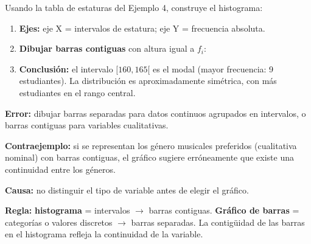 \documentclass[11pt, letterpaper]{article}
\begin{document}
\begin{tcolorbox}[examplebox, title={Ej. 5. Histograma de estaturas}]
Usando la tabla de estaturas del Ejemplo 4, construye el histograma:

\begin{enumerate}[label=\textbf{Paso \arabic*.}]
  \item \textbf{Ejes:} eje X = intervalos de estatura; eje Y = frecuencia absoluta.
  \medskip
  \item \textbf{Dibujar barras contiguas} con altura igual a $f_i$:

  \begin{center}
  \end{center}

  \medskip
  \item \textbf{Conclusi\'on:} el intervalo $[160,165[$ es el modal (mayor frecuencia: 9 estudiantes). La distribuci\'on es aproximadamente sim\'etrica, con m\'as estudiantes en el rango central.
\end{enumerate}
\end{tcolorbox}

\begin{tcolorbox}[warningbox, title={Error frecuente: usar histograma cuando corresponde gr\'afico de barras (y viceversa)}]
\textbf{Error:} dibujar barras separadas para datos continuos agrupados en intervalos, o barras contiguas para variables cualitativas.

\medskip
\textbf{Contraejemplo:} si se representan los g\'enero musicales preferidos (cualitativa nominal) con barras contiguas, el gr\'afico sugiere err\'oneamente que existe una continuidad entre los g\'eneros.

\medskip
\textbf{Causa:} no distinguir el tipo de variable antes de elegir el gr\'afico.

\medskip
\textbf{Regla:} \textbf{histograma} = intervalos $\to$ barras contiguas. \textbf{Gr\'afico de barras} = categor\'ias o valores discretos $\to$ barras separadas. La contig\"uidad de las barras en el histograma refleja la continuidad de la variable.
\end{tcolorbox}
\end{document}
